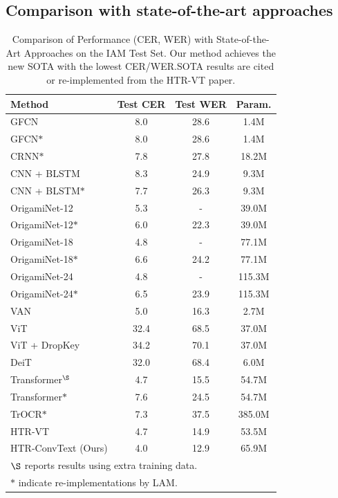 \documentclass[final,5p,times]{elsarticle}
\begin{document}
\subsection{Comparison with state-of-the-art approaches}
\begin{table}[!t]
\centering
\caption{Comparison of Performance (CER, WER) with State-of-the-Art Approaches on the IAM Test Set. Our method achieves the new SOTA with the lowest CER/WER.SOTA results are cited or re-implemented from the HTR-VT paper.}
\label{tab:comparison}
\begin{tabular}{l|c|c|c}
\hline
\textbf{Method} & \textbf{Test CER} & \textbf{Test WER} & \textbf{Param.} \\
\hline
GFCN & 8.0 & 28.6 & 1.4M \\
GFCN$\ast$ & 8.0 & 28.6 & 1.4M \\
CRNN$\ast$ & 7.8 & 27.8 & 18.2M \\
CNN + BLSTM & 8.3 & 24.9 & 9.3M \\
CNN + BLSTM$\ast$ & 7.7 & 26.3 & 9.3M \\
OrigamiNet-12 & 5.3 & - & 39.0M \\
OrigamiNet-12$\ast$ & 6.0 & 22.3 & 39.0M \\
OrigamiNet-18 & 4.8 & - & 77.1M \\
OrigamiNet-18$\ast$ & 6.6 & 24.2 & 77.1M \\
OrigamiNet-24 & 4.8 & - & 115.3M \\
OrigamiNet-24$\ast$ & 6.5 & 23.9 & 115.3M \\
VAN & 5.0 & 16.3 & 2.7M \\
ViT & 32.4 & 68.5 & 37.0M \\
ViT + DropKey & 34.2 & 70.1 & 37.0M \\
DeiT & 32.0 & 68.4 & 6.0M \\
Transformer$^{\S}$ & 4.7 & 15.5 & 54.7M \\
Transformer$\ast$ & 7.6 & 24.5 & 54.7M \\
TrOCR$\ast$ & 7.3 & 37.5 & 385.0M \\
HTR-VT & 4.7 & 14.9 & 53.5M \\
HTR-ConvText (Ours) & 4.0 & 12.9 & 65.9M \\
\hline
\multicolumn{4}{l}{\footnotesize{$\S$ reports results using extra training data.}} \\
\multicolumn{4}{l}{\footnotesize{$\ast$ indicate re-implementations by LAM.}} \\
\end{tabular}
\end{table}
\end{document}
